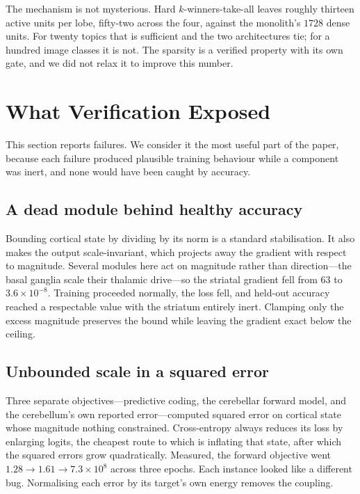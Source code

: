 \documentclass[conference]{IEEEtran}
\begin{document}
The mechanism is not mysterious. Hard $k$-winners-take-all leaves roughly
thirteen active units per lobe, fifty-two across the four, against the
monolith's $1728$ dense units. For twenty topics that is sufficient and the two
architectures tie; for a hundred image classes it is not. The sparsity is a
verified property with its own gate, and we did not relax it to improve this
number.

\section{What Verification Exposed}

This section reports failures. We consider it the most useful part of the paper,
because each failure produced plausible training behaviour while a component was
inert, and none would have been caught by accuracy.

\subsection{A dead module behind healthy accuracy}

Bounding cortical state by dividing by its norm is a standard stabilisation.
It also makes the output scale-invariant, which projects away the gradient with
respect to magnitude. Several modules here act on magnitude rather than
direction---the basal ganglia scale their thalamic drive---so the striatal
gradient fell from $63$ to $3.6 \times 10^{-8}$. Training proceeded normally,
the loss fell, and held-out accuracy reached a respectable value with the
striatum entirely inert. Clamping only the excess magnitude preserves the bound
while leaving the gradient exact below the ceiling.

\subsection{Unbounded scale in a squared error}

Three separate objectives---predictive coding, the cerebellar forward model, and
the cerebellum's own reported error---computed squared error on cortical state
whose magnitude nothing constrained. Cross-entropy always reduces its loss by
enlarging logits, the cheapest route to which is inflating that state, after
which the squared errors grow quadratically. Measured, the forward objective
went $1.28 \rightarrow 1.61 \rightarrow 7.3\times10^{8}$ across three epochs.
Each instance looked like a different bug. Normalising each error by its
target's own energy removes the coupling.
\end{document}
